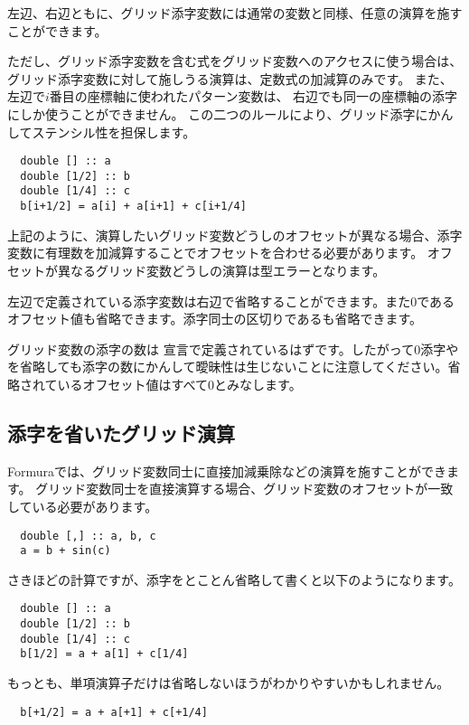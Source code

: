 \documentclass{jsarticle}
\begin{document}
左辺、右辺ともに、グリッド添字変数には通常の変数と同様、任意の演算を施すことができます。

ただし、グリッド添字変数を含む式をグリッド変数へのアクセスに使う場合は、
グリッド添字変数に対して施しうる演算は、定数式の加減算のみです。
また、左辺で$i$番目の座標軸に使われたパターン変数は、
右辺でも同一の座標軸の添字にしか使うことができません。
この二つのルールにより、グリッド添字にかんしてステンシル性を担保します。

\begin{lstlisting}
  double [] :: a
  double [1/2] :: b
  double [1/4] :: c
  b[i+1/2] = a[i] + a[i+1] + c[i+1/4]
\end{lstlisting}

上記のように、演算したいグリッド変数どうしのオフセットが異なる場合、添字変数に有理数を加減算することでオフセットを合わせる必要があります。
オフセットが異なるグリッド変数どうしの演算は型エラーとなります。

左辺で定義されている添字変数は右辺で省略することができます。また0であるオフセット値も省略できます。添字同士の区切りである\lit{,}も省略できます。


グリッド変数の添字の数は
宣言で定義されているはずです。したがって0添字や\lit{,}を省略しても添字の数にかんして曖昧性は生じないことに注意してください。省略されているオフセット値はすべて0とみなします。


\subsection{添字を省いたグリッド演算}

Formuraでは、グリッド変数同士に直接加減乗除などの演算を施すことができます。
グリッド変数同士を直接演算する場合、グリッド変数のオフセットが一致している必要があります。

\begin{lstlisting}
  double [,] :: a, b, c
  a = b + sin(c)
\end{lstlisting}

さきほどの計算ですが、添字をとことん省略して書くと以下のようになります。

\begin{lstlisting}
  double [] :: a
  double [1/2] :: b
  double [1/4] :: c
  b[1/2] = a + a[1] + c[1/4]
\end{lstlisting}

もっとも、単項\lit{+}演算子だけは省略しないほうがわかりやすいかもしれません。
\begin{lstlisting}
  b[+1/2] = a + a[+1] + c[+1/4]
\end{lstlisting}
\end{document}
